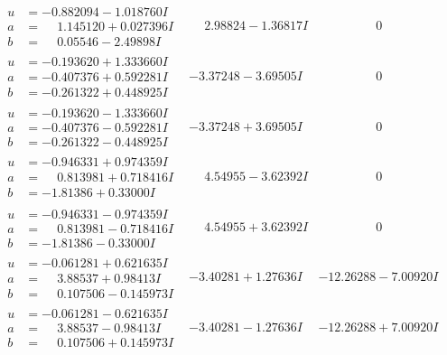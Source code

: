 \documentclass[1p]{elsarticle_modified}
\theoremstyle{definition}
\begin{document}
$$\begin{array}{c|c|c}
\begin{aligned}
u &= -0.882094 - 1.018760 I \\
a &= \phantom{-}1.145120 + 0.027396 I \\
b &= \phantom{-}0.05546 - 2.49898 I\end{aligned}
 & \phantom{-}2.98824 - 1.36817 I & \phantom{-0.000000 } 0 \\ \hline\begin{aligned}
u &= -0.193620 + 1.333660 I \\
a &= -0.407376 + 0.592281 I \\
b &= -0.261322 + 0.448925 I\end{aligned}
 & -3.37248 - 3.69505 I & \phantom{-0.000000 } 0 \\ \hline\begin{aligned}
u &= -0.193620 - 1.333660 I \\
a &= -0.407376 - 0.592281 I \\
b &= -0.261322 - 0.448925 I\end{aligned}
 & -3.37248 + 3.69505 I & \phantom{-0.000000 } 0 \\ \hline\begin{aligned}
u &= -0.946331 + 0.974359 I \\
a &= \phantom{-}0.813981 + 0.718416 I \\
b &= -1.81386 + 0.33000 I\end{aligned}
 & \phantom{-}4.54955 - 3.62392 I & \phantom{-0.000000 } 0 \\ \hline\begin{aligned}
u &= -0.946331 - 0.974359 I \\
a &= \phantom{-}0.813981 - 0.718416 I \\
b &= -1.81386 - 0.33000 I\end{aligned}
 & \phantom{-}4.54955 + 3.62392 I & \phantom{-0.000000 } 0 \\ \hline\begin{aligned}
u &= -0.061281 + 0.621635 I \\
a &= \phantom{-}3.88537 + 0.98413 I \\
b &= \phantom{-}0.107506 - 0.145973 I\end{aligned}
 & -3.40281 + 1.27636 I & -12.26288 - 7.00920 I \\ \hline\begin{aligned}
u &= -0.061281 - 0.621635 I \\
a &= \phantom{-}3.88537 - 0.98413 I \\
b &= \phantom{-}0.107506 + 0.145973 I\end{aligned}
 & -3.40281 - 1.27636 I & -12.26288 + 7.00920 I \\ \hline\begin{aligned}

\end{aligned}
\end{array}$$
\end{document}

